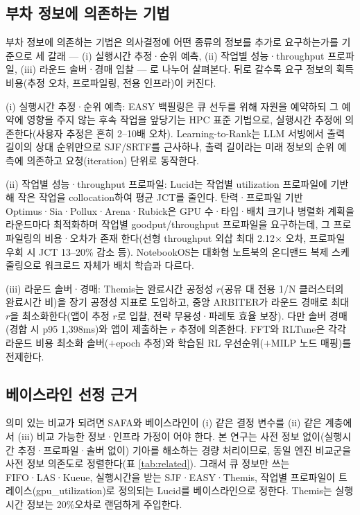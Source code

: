 \documentclass{ieeetj}
\begin{document}
\subsection{부차 정보에 의존하는 기법}
부차 정보에 의존하는 기법은 의사결정에 어떤 종류의 정보를 추가로 요구하는가를 기준으로 세 갈래 --- (i) 실행시간 추정·순위 예측, (ii) 작업별 성능·throughput 프로파일, (iii) 라운드 솔버·경매 입찰 --- 로 나누어 살펴본다. 뒤로 갈수록 요구 정보의 획득 비용(추정 오차, 프로파일링, 전용 인프라)이 커진다.

(i) 실행시간 추정·순위 예측: EASY 백필링\cite{mualem2001backfilling}은 큐 선두를 위해 자원을 예약하되 그 예약에 영향을 주지 않는 후속 작업을 앞당기는 HPC 표준 기법으로, 실행시간 추정에 의존한다(사용자 추정은 흔히 2--10배 오차). Learning-to-Rank\cite{fu2024efficient}는 LLM 서빙에서 출력 길이의 상대 순위만으로 SJF/SRTF를 근사하나, 출력 길이라는 미래 정보의 순위 예측에 의존하고 요청(iteration) 단위로 동작한다.

(ii) 작업별 성능·throughput 프로파일: Lucid\cite{b5}는 작업별 utilization 프로파일에 기반해 작은 작업을 collocation하여 평균 JCT를 줄인다. 탄력·프로파일 기반 Optimus\cite{peng2018optimus}·Sia\cite{b4}·Pollux\cite{qiao2021pollux}·Arena\cite{arena2026}·Rubick\cite{rubick2025}은 GPU 수·타입·배치 크기나 병렬화 계획을 라운드마다 최적화하며 작업별 goodput/throughput 프로파일을 요구하는데, 그 프로파일링의 비용·오차가 존재 한다(선형 throughput 외삽 최대 2.12$\times$ 오차, 프로파일 우회 시 JCT 13--20\% 감소 등\cite{schedmate2025}). NotebookOS\cite{notebookos2026}는 대화형 노트북의 온디맨드 복제 스케줄링으로 워크로드 자체가 배치 학습과 다르다.

(iii) 라운드 솔버·경매: Themis\cite{mahajan2020themis}는 완료시간 공정성 $r$(공유 대 전용 1/N 클러스터의 완료시간 비)을 장기 공정성 지표로 도입하고, 중앙 ARBITER가 라운드 경매로 최대 $r$을 최소화한다(앱이 추정 $r$로 입찰, 전략 무용성·파레토 효율 보장). 다만 솔버 경매(경합 시 p95 1,398ms)와 앱이 제출하는 $r$ 추정에 의존한다. FFT\cite{fft2025}와 RLTune\cite{rltune2025}은 각각 라운드 비용 최소화 솔버($+$epoch 추정)와 학습된 RL 우선순위($+$MILP 노드 매핑)를 전제한다.

\subsection{베이스라인 선정 근거}\label{baseline-rationale}
의미 있는 비교가 되려면 SAFA와 베이스라인이 (i) 같은 결정 변수를 (ii) 같은 계층에서 (iii) 비교 가능한 정보·인프라 가정이 어야 한다. 본 연구는 사전 정보 없이(실행시간 추정·프로파일·솔버 없이) 기아를 해소하는 경량 처리이므로, 동일 엔진 비교군을 사전 정보 의존도로 정렬한다(표 \ref{tab:related}). 그래서 큐 정보만 쓰는 FIFO·LAS·Kueue, 실행시간을 받는 SJF·EASY·Themis, 작업별 프로파일이 트레이스(gpu\_utilization)로 정의되는 Lucid를 베이스라인으로 정한다. Themis는 실행 시간 정보는 20\%오차로 랜덤하게 주입한다.
\end{document}
